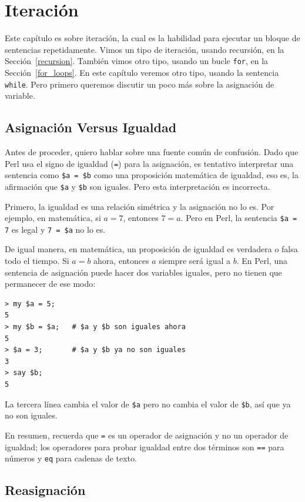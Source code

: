 
\chapter{Iteración}
\label{iteration}

Este capítulo es sobre iteración, la cual es la habilidad
para ejecutar un bloque de sentencias repetidamente. Vimos
un tipo de iteración, usando recursión, en la Sección~\ref{recursion}.
También vimos otro tipo, usando un bucle {\tt for}, en la
Sección~\ref{for_loops}. En este capítulo veremos otro tipo, 
usando la sentencia {\tt while}. Pero primero queremos discutir
un poco más sobre la asignación de variable.

\section{Asignación Versus Igualdad}

Antes de proceder, quiero hablar sobre una fuente común de confusión.
Dado que Perl usa el signo de igualdad ({\tt =}) para la asignación, 
es tentativo interpretar una sentencia como {\tt \$a = \$b} como 
una proposición matemática de igualdad, eso es, la afirmación que 
{\tt \$a} y {\tt \$b} son iguales. Pero esta interpretación es incorrecta.

Primero, la igualdad es una relación simétrica y la asignación no lo es. 
Por ejemplo, en matemática, si $a = 7$, entonces $7 = a$. Pero en Perl, 
la sentencia {\tt \$a = 7} es legal y {\tt 7 = \$a} no lo es.

De igual manera, en matemática, un proposición de igualdad es verdadera
o falsa todo el tiempo. Si $a = b$ ahora, entonces $a$ siempre será igual
a $b$. En Perl, una sentencia de asignación puede hacer dos variables iguales,
pero no tienen que permanecer de ese modo:

\begin{verbatim}
> my $a = 5;
5
> my $b = $a;   # $a y $b son iguales ahora
5
> $a = 3;       # $a y $b ya no son iguales
3
> say $b;
5
\end{verbatim}
%
La tercera línea cambia el valor de {\tt \$a} pero no cambia el 
valor de {\tt \$b}, así que ya no son iguales.

En resumen, recuerda que {\tt =} es un operador de asignación y
no un operador de igualdad; los operadores para probar igualdad entre
dos términos son {\tt ==} para números y {\tt eq} para cadenas de 
texto.
\section{Reasignación}

